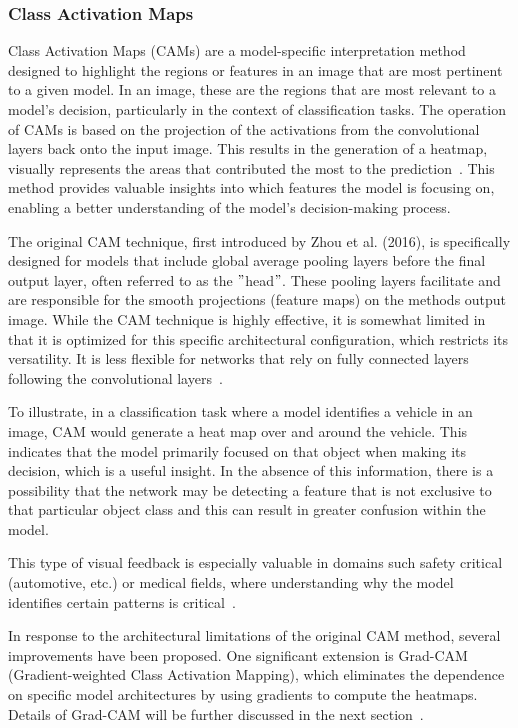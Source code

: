 \subsubsection{Class Activation Maps}\label{subsubsec:CAM}

Class Activation Maps (CAMs) are a model-specific interpretation method designed to highlight the regions or features
in an image that are most pertinent to a given model.
In an image, these are the regions that are most relevant to a model's decision, particularly in the context of classification tasks.
The operation of CAMs is based on the projection of the activations from the  convolutional layers back onto the input image.
This results in the generation of a heatmap, visually represents the areas that contributed
the most to the prediction~\cite{Muhammad_2020}.
This method provides valuable insights into which features the model is focusing on, enabling a better understanding of
the model's decision-making process.

The original CAM technique, first introduced by Zhou et al. (2016),
is specifically designed for models that include global average pooling layers before the final output layer,
often referred to as the \("\)head\("\).
These pooling layers facilitate and are responsible for the smooth projections (feature maps) on the methods output image.
While the CAM technique is highly effective, it is somewhat limited in that it is optimized for this specific architectural
configuration, which restricts its versatility.
It is less flexible for networks that rely on fully connected layers following the convolutional layers~\cite{Zhou_2016}.

To illustrate, in a classification task where a model identifies a vehicle in an image, CAM would generate a heat map over and around the vehicle.
This indicates that the model primarily focused on that object when making its decision, which is a useful insight.
In the absence of this information, there is a possibility that the network may be detecting a feature that is not
exclusive to that particular object class and this can result in greater confusion within the model.

This type of visual feedback is especially valuable in domains such safety critical (automotive, etc.) or medical fields,
where understanding why the model identifies certain patterns is critical~\cite{Muhammad_2020}.

In response to the architectural limitations of the original CAM method, several improvements have been proposed.
One significant extension is Grad-CAM (Gradient-weighted Class Activation Mapping), which eliminates the dependence
on specific model architectures by using gradients to compute the heatmaps.
Details of Grad-CAM will be further discussed in the next section~\cite{Selvaraju_2019}.

